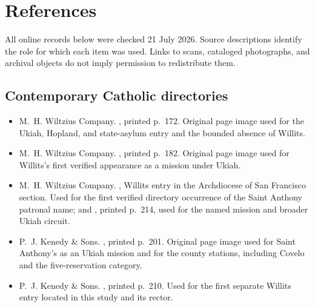\section{References}

All online records below were checked 21 July 2026. Source descriptions identify the role for which each item was used. Links to scans, cataloged photographs, and archival objects do not imply permission to redistribute them.

\begingroup
\setlength{\parskip}{0.2em}

\subsection{Contemporary Catholic directories}

\begin{itemize}[leftmargin=1.35em,itemsep=0.2em,topsep=0.2em]
\item M.~H. Wiltzius Company. , printed p.~172. Original page image used for the Ukiah, Hopland, and state-asylum entry and the bounded absence of Willits.
\item M.~H. Wiltzius Company. , printed p.~182. Original page image used for Willits's first verified appearance as a mission under Ukiah.
\item M.~H. Wiltzius Company. , Willits entry in the Archdiocese of San Francisco section. Used for the first verified directory occurrence of the Saint Anthony patronal name; and , printed p.~214, used for the named mission and broader Ukiah circuit.
\item P.~J. Kenedy \& Sons. , printed p.~201. Original page image used for Saint Anthony's as an Ukiah mission and for the county stations, including Covelo and the five-reservation category.
\item P.~J. Kenedy \& Sons. , printed p.~210. Used for the first separate Willits entry located in this study and its rector.

\end{itemize}
